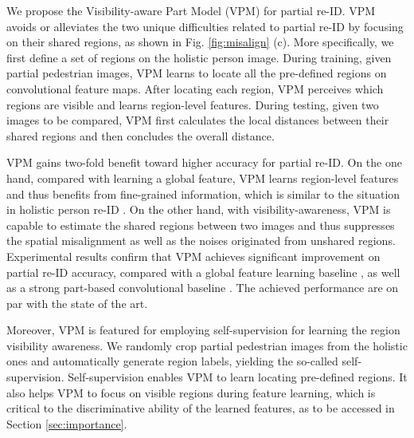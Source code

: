 \documentclass[10pt,twocolumn,letterpaper]{article}
\begin{document}
We propose the Visibility-aware Part Model (VPM) for partial re-ID. VPM avoids or alleviates the two unique difficulties related to partial re-ID by focusing on their shared regions, as shown in Fig. \ref{fig:misalign} (c). More specifically, we first define a set of regions on the holistic person image. During training, given partial pedestrian images, VPM learns to locate all the pre-defined regions on convolutional feature maps. After locating each region, VPM perceives which regions are visible and learns region-level features. During testing, given two images to be compared, VPM first calculates the local distances between their shared regions and then concludes the overall distance.   

VPM gains two-fold benefit toward higher accuracy for partial re-ID. On the one hand, compared with learning a global feature, VPM learns region-level features and thus benefits from fine-grained information, which is similar to the situation in holistic person re-ID \cite{PCB_ECCV, cvpr2018:SPReID}. On the other hand, with visibility-awareness, VPM is capable to estimate the shared regions between two images and thus suppresses the spatial misalignment as well as the noises originated from unshared regions. Experimental results confirm that VPM achieves significant improvement on partial re-ID accuracy, compared with a global feature learning baseline \cite{DBLP:journals/corr/ZhengYH16}, as well as a strong part-based convolutional baseline \cite{PCB_ECCV}. The achieved performance are on par with the state of the art. 

Moreover, VPM is featured for employing self-supervision for learning the region visibility awareness. We randomly crop partial pedestrian images from the holistic ones and automatically generate region labels, yielding the so-called self-supervision. Self-supervision enables VPM to learn locating pre-defined regions. It also helps VPM to focus on visible regions during feature learning, which is critical to the discriminative ability of the learned features, as to be accessed in Section \ref{sec:importance}.
\end{document}
